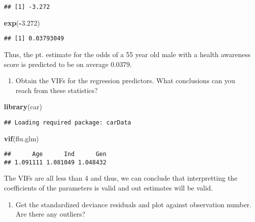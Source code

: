 \documentclass[]{article}
\newenvironment{Shaded}{\begin{snugshade}}{\end{snugshade}}
\newcommand{\KeywordTok}[1]{\textcolor[rgb]{0.13,0.29,0.53}{\textbf{#1}}}
\newcommand{\FloatTok}[1]{\textcolor[rgb]{0.00,0.00,0.81}{#1}}
\newcommand{\OperatorTok}[1]{\textcolor[rgb]{0.81,0.36,0.00}{\textbf{#1}}}
\newcommand{\NormalTok}[1]{#1}
\providecommand{\tightlist}{%
  \setlength{\itemsep}{0pt}\setlength{\parskip}{0pt}}
\begin{document}
\begin{verbatim}
## [1] -3.272
\end{verbatim}

\begin{Shaded}
\begin{Highlighting}[]
\KeywordTok{exp}\NormalTok{(}\OperatorTok{-}\FloatTok{3.272}\NormalTok{)}
\end{Highlighting}
\end{Shaded}

\begin{verbatim}
## [1] 0.03793049
\end{verbatim}

Thus, the pt. estimate for the odds of a 55 year old male with a health
awareness score is predicted to be on average 0.0379.

\begin{enumerate}
\def\labelenumi{\Alph{enumi})}
\setcounter{enumi}{2}
\tightlist
\item
  Obtain the VIFs for the regression predictors. What conclusions can
  you reach from these statistics?
\end{enumerate}

\begin{Shaded}
\begin{Highlighting}[]
\KeywordTok{library}\NormalTok{(car)}
\end{Highlighting}
\end{Shaded}

\begin{verbatim}
## Loading required package: carData
\end{verbatim}

\begin{Shaded}
\begin{Highlighting}[]
\KeywordTok{vif}\NormalTok{(flu.glm)}
\end{Highlighting}
\end{Shaded}

\begin{verbatim}
##      Age      Ind      Gen 
## 1.091111 1.081049 1.048432
\end{verbatim}

The VIFs are all less than 4 and thus, we can conclude that
interpretting the coefficients of the parameters is valid and out
estimates will be valid.

\begin{enumerate}
\def\labelenumi{\Alph{enumi})}
\setcounter{enumi}{3}
\tightlist
\item
  Get the standardized deviance residuals and plot against observation
  number. Are there any outliers?
\end{enumerate}
\end{document}
